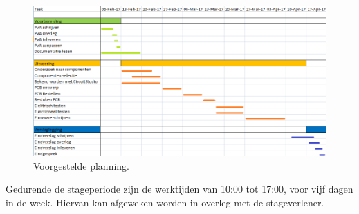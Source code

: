 \begin{figure}[hbtp]
	\centering
	\includegraphics[width=1.0\textwidth]{figures/planning.png}
	\caption{Voorgestelde planning.}
	\label{fig:planning}
\end{figure}

Gedurende de stageperiode zijn de werktijden van 10:00 tot 17:00, voor vijf dagen in de week. Hiervan kan afgeweken worden in overleg met de stageverlener. 